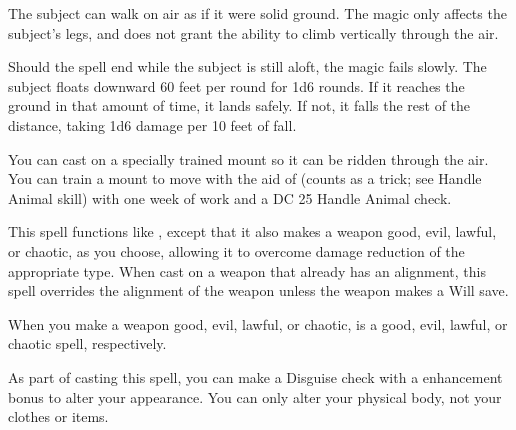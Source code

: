 \spellrng{\rngtouch}
\spelldur{\durshort}
\begin{spelleffect}
  The subject can walk on air as if it were solid ground. The magic only affects the subject's legs, and does not grant the ability to climb vertically through the air.
  \par Should the spell end while the subject is still aloft, the magic fails slowly. The subject floats downward 60 feet per round for 1d6 rounds. If it reaches the ground in that amount of time, it lands safely. If not, it falls the rest of the distance, taking 1d6 damage per 10 feet of fall.
\end{spelleffect}
\begin{spellnotes}
  \par You can cast  on a specially trained mount so it can be ridden through the air. You can train a mount to move with the aid of  (counts as a trick; see Handle Animal skill) with one week of work and a DC 25 Handle Animal check.
\end{spellnotes}

\begin{spelleffect}
  This spell functions like , except that it also makes a weapon good, evil, lawful, or chaotic, as you choose, allowing it to overcome damage reduction of the appropriate type. When cast on a weapon that already has an alignment, this spell overrides the alignment of the weapon unless the weapon makes a Will save.
\end{spelleffect}
\begin{spellnotes}
  When you make a weapon good, evil, lawful, or chaotic,  is a good, evil, lawful, or chaotic spell, respectively.
\end{spellnotes}

\spelldur{\durlong}
\begin{spelleffect}
    As part of casting this spell, you can make a Disguise check with a  enhancement bonus to alter your appearance. You can only alter your physical body, not your clothes or items.
\end{spelleffect}

